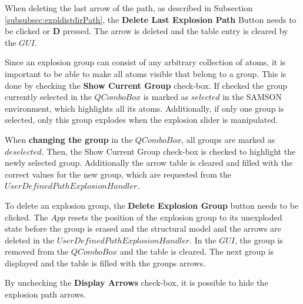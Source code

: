 \documentclass[draft,final]{vutinfth} %
\begin{document}
\par When deleting the last arrow of the path, as described in Subsection \ref{subsubsec:expldistdirPath}, the \textbf{Delete Last Explosion Path} Button needs to be clicked or \textbf{D} pressed. The arrow is deleted and the table entry is cleared by the $GUI$.

\par Since an explosion group can consist of any arbitrary collection of atoms, it is important to be able to make all atoms visible that belong to a group. This is done by checking the \textbf{Show Current Group} check-box. If checked the group currently selected in the $QComboBox$ is marked as $selected$ in the SAMSON environment, which highlights all its atoms. Additionally, if only one group is selected, only this group explodes when the explosion slider is manipulated.

\par When \textbf{changing the group} in the $QComboBox$, all groups are marked as $deselected$. Then, the Show Current Group check-box is checked to highlight the newly selected group. Additionally the arrow table is cleared and filled with the correct values for the new group, which are requested from the $UserDefinedPathExplosionHandler$.

\par To delete an explosion group, the \textbf{Delete Explosion Group} button needs to be clicked. The $App$ resets the position of the explosion group to its unexploded state before the group is erased and the structural model and the arrows are deleted in the $UserDefinedPathExplosionHandler$. In the $GUI$, the group is removed from the $QComboBox$ and the table is cleared. The next group is displayed and the table is filled with the groups arrows.

\par By unchecking the \textbf{Display Arrows} check-box, it is possible to hide the explosion path arrows.
\end{document}
